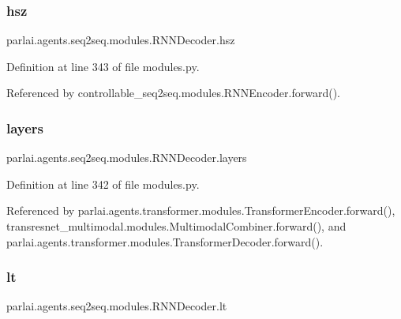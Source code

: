 \subsubsection{\texorpdfstring{hsz}{hsz}}
{\footnotesize\ttfamily parlai.\+agents.\+seq2seq.\+modules.\+R\+N\+N\+Decoder.\+hsz}



Definition at line 343 of file modules.\+py.



Referenced by controllable\+\_\+seq2seq.\+modules.\+R\+N\+N\+Encoder.\+forward().

\mbox{\label{classparlai_1_1agents_1_1seq2seq_1_1modules_1_1RNNDecoder_aa72b03f6c3bf630739d3147b4b2711c4}} 
\subsubsection{\texorpdfstring{layers}{layers}}
{\footnotesize\ttfamily parlai.\+agents.\+seq2seq.\+modules.\+R\+N\+N\+Decoder.\+layers}



Definition at line 342 of file modules.\+py.



Referenced by parlai.\+agents.\+transformer.\+modules.\+Transformer\+Encoder.\+forward(), transresnet\+\_\+multimodal.\+modules.\+Multimodal\+Combiner.\+forward(), and parlai.\+agents.\+transformer.\+modules.\+Transformer\+Decoder.\+forward().

\mbox{\label{classparlai_1_1agents_1_1seq2seq_1_1modules_1_1RNNDecoder_a86a529bada7d11138e31c658b2c10dbb}} 
\subsubsection{\texorpdfstring{lt}{lt}}
{\footnotesize\ttfamily parlai.\+agents.\+seq2seq.\+modules.\+R\+N\+N\+Decoder.\+lt}




